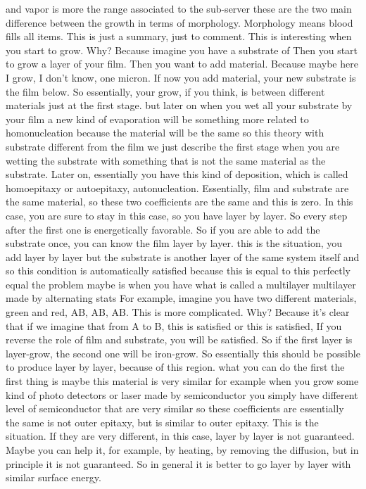 and vapor is more the range associated to the sub-server these are the two main difference between the growth in terms of morphology. Morphology means blood fills all items.
This is just a summary, just to comment. This is interesting when you start to grow. Why? Because imagine you have a substrate of Then you start to grow a layer of your film. Then you want to add material. Because maybe here I grow, I don't know, one micron. If now you add material, your new substrate is the film below. So essentially, your grow, if you think, is between different materials just at the first stage. but later on when you wet all your substrate by your film a new kind of evaporation will be something more related to homonucleation because the material will be the same so this theory with substrate different from the film we just describe the first stage when you are wetting the substrate with something that is not the same material as the substrate. Later on, essentially you have this kind of deposition, which is called homoepitaxy or autoepitaxy, autonucleation. Essentially, film and substrate are the same material, so these two coefficients are the same and this is zero. In this case, you are sure to stay in this case, so you have layer by layer. So every step after the first one is energetically favorable. So if you are able to add the substrate once, you can know the film layer by layer. this is the situation, you add layer by layer but the substrate is another layer of the same system itself and so this condition is automatically satisfied because this is equal to this perfectly equal the problem maybe is when you have what is called a multilayer multilayer made by alternating stats For example, imagine you have two different materials, green and red, AB, AB, AB. This is more complicated. Why? Because it's clear that if we imagine that from A to B, this is satisfied or this is satisfied, If you reverse the role of film and substrate, you will be satisfied. So if the first layer is layer-grow, the second one will be iron-grow. So essentially this should be possible to produce layer by layer, because of this region. what you can do the first the first thing is maybe this material is very similar for example when you grow some kind of photo detectors or laser made by semiconductor you simply have different level of semiconductor that are very similar so these coefficients are essentially the same is not outer epitaxy, but is similar to outer epitaxy. This is the situation. If they are very different, in this case, layer by layer is not guaranteed. Maybe you can help it, for example, by heating, by removing the diffusion, but in principle it is not guaranteed. So in general it is better to go layer by layer with similar surface energy.
